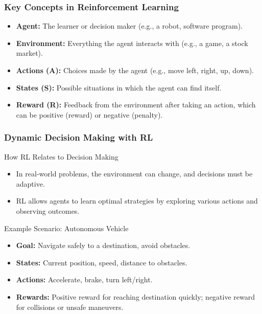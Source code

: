 \documentclass[aspectratio=169]{beamer}
\begin{document}
\begin{frame}[fragile]
    \frametitle{Key Concepts in Reinforcement Learning}
    \begin{itemize}
        \item \textbf{Agent:} The learner or decision maker (e.g., a robot, software program).
        \item \textbf{Environment:} Everything the agent interacts with (e.g., a game, a stock market).
        \item \textbf{Actions (A):} Choices made by the agent (e.g., move left, right, up, down).
        \item \textbf{States (S):} Possible situations in which the agent can find itself.
        \item \textbf{Reward (R):} Feedback from the environment after taking an action, which can be positive (reward) or negative (penalty).
    \end{itemize}
\end{frame}

\begin{frame}[fragile]
    \frametitle{Dynamic Decision Making with RL}
    \begin{block}{How RL Relates to Decision Making}
        \begin{itemize}
            \item In real-world problems, the environment can change, and decisions must be adaptive. 
            \item RL allows agents to learn optimal strategies by exploring various actions and observing outcomes.
        \end{itemize}
    \end{block}
    \begin{block}{Example Scenario: Autonomous Vehicle}
        \begin{itemize}
            \item \textbf{Goal:} Navigate safely to a destination, avoid obstacles.
            \item \textbf{States:} Current position, speed, distance to obstacles.
            \item \textbf{Actions:} Accelerate, brake, turn left/right.
            \item \textbf{Rewards:} Positive reward for reaching destination quickly; negative reward for collisions or unsafe maneuvers.
        \end{itemize}
    \end{block}
\end{frame}
\end{document}
